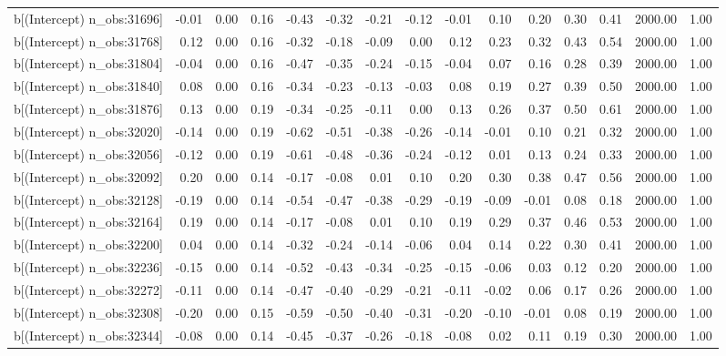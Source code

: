 \begin{table}[ht]
\begin{tabular}{rrrrrrrrrrrrrrr}
  b[(Intercept) n\_obs:31696] & -0.01 & 0.00 & 0.16 & -0.43 & -0.32 & -0.21 & -0.12 & -0.01 & 0.10 & 0.20 & 0.30 & 0.41 & 2000.00 & 1.00 \\ 
  b[(Intercept) n\_obs:31768] & 0.12 & 0.00 & 0.16 & -0.32 & -0.18 & -0.09 & 0.00 & 0.12 & 0.23 & 0.32 & 0.43 & 0.54 & 2000.00 & 1.00 \\ 
  b[(Intercept) n\_obs:31804] & -0.04 & 0.00 & 0.16 & -0.47 & -0.35 & -0.24 & -0.15 & -0.04 & 0.07 & 0.16 & 0.28 & 0.39 & 2000.00 & 1.00 \\ 
  b[(Intercept) n\_obs:31840] & 0.08 & 0.00 & 0.16 & -0.34 & -0.23 & -0.13 & -0.03 & 0.08 & 0.19 & 0.27 & 0.39 & 0.50 & 2000.00 & 1.00 \\ 
  b[(Intercept) n\_obs:31876] & 0.13 & 0.00 & 0.19 & -0.34 & -0.25 & -0.11 & 0.00 & 0.13 & 0.26 & 0.37 & 0.50 & 0.61 & 2000.00 & 1.00 \\ 
  b[(Intercept) n\_obs:32020] & -0.14 & 0.00 & 0.19 & -0.62 & -0.51 & -0.38 & -0.26 & -0.14 & -0.01 & 0.10 & 0.21 & 0.32 & 2000.00 & 1.00 \\ 
  b[(Intercept) n\_obs:32056] & -0.12 & 0.00 & 0.19 & -0.61 & -0.48 & -0.36 & -0.24 & -0.12 & 0.01 & 0.13 & 0.24 & 0.33 & 2000.00 & 1.00 \\ 
  b[(Intercept) n\_obs:32092] & 0.20 & 0.00 & 0.14 & -0.17 & -0.08 & 0.01 & 0.10 & 0.20 & 0.30 & 0.38 & 0.47 & 0.56 & 2000.00 & 1.00 \\ 
  b[(Intercept) n\_obs:32128] & -0.19 & 0.00 & 0.14 & -0.54 & -0.47 & -0.38 & -0.29 & -0.19 & -0.09 & -0.01 & 0.08 & 0.18 & 2000.00 & 1.00 \\ 
  b[(Intercept) n\_obs:32164] & 0.19 & 0.00 & 0.14 & -0.17 & -0.08 & 0.01 & 0.10 & 0.19 & 0.29 & 0.37 & 0.46 & 0.53 & 2000.00 & 1.00 \\ 
  b[(Intercept) n\_obs:32200] & 0.04 & 0.00 & 0.14 & -0.32 & -0.24 & -0.14 & -0.06 & 0.04 & 0.14 & 0.22 & 0.30 & 0.41 & 2000.00 & 1.00 \\ 
  b[(Intercept) n\_obs:32236] & -0.15 & 0.00 & 0.14 & -0.52 & -0.43 & -0.34 & -0.25 & -0.15 & -0.06 & 0.03 & 0.12 & 0.20 & 2000.00 & 1.00 \\ 
  b[(Intercept) n\_obs:32272] & -0.11 & 0.00 & 0.14 & -0.47 & -0.40 & -0.29 & -0.21 & -0.11 & -0.02 & 0.06 & 0.17 & 0.26 & 2000.00 & 1.00 \\ 
  b[(Intercept) n\_obs:32308] & -0.20 & 0.00 & 0.15 & -0.59 & -0.50 & -0.40 & -0.31 & -0.20 & -0.10 & -0.01 & 0.08 & 0.19 & 2000.00 & 1.00 \\ 
  b[(Intercept) n\_obs:32344] & -0.08 & 0.00 & 0.14 & -0.45 & -0.37 & -0.26 & -0.18 & -0.08 & 0.02 & 0.11 & 0.19 & 0.30 & 2000.00 & 1.00 \\ 

\end{tabular}
\end{table}
